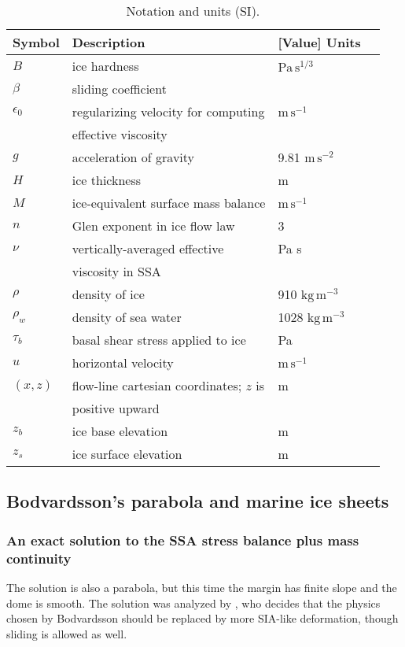 \documentclass[twocolumn,letterpaper]{igs}
\newcommand{\eps}{\epsilon}
\begin{document}
\small
\begin{table}
\caption{Notation and units (SI).}\label{tab:notation}

\medskip
\begin{tabular}{llll}
Symbol & Description & [Value] Units \\ \hline
$B$ & ice hardness & $\text{Pa}\,\text{s}^{1/3}$  \\
$\beta$ & sliding coefficient & \\
$\eps_0$ & regularizing velocity for computing & $\text{m}\,\text{s}^{-1}$ \\
 & \quad effective viscosity &  \\
$g$ & acceleration of gravity  & 9.81 $\text{m}\,\text{s}^{-2}$\\
$H$ & ice thickness & m \\
$M$ & ice-equivalent surface mass balance & $\text{m}\,\text{s}^{-1}$ \\
$n$ & Glen exponent in ice flow law & 3 \\
$\nu$ & vertically-averaged effective & Pa s \\
 & \quad  viscosity in SSA & \\
$\rho$ & density of ice & 910 $\text{kg}\,\text{m}^{-3}$ \\
$\rho_w$ & density of sea water & 1028 $\text{kg}\,\text{m}^{-3}$ \\
$\tau_{b}$ & basal shear stress applied to ice & Pa \\
$u$ & horizontal velocity & $\text{m}\,\text{s}^{-1}$ \\
$(x,z)$ & flow-line cartesian coordinates; $z$ is & m  \\
 & \quad positive upward & \\
$z_b$ & ice base elevation & m \\
$z_s$ & ice surface elevation & m
\end{tabular}
\end{table}


\subsection*{Bodvardsson's parabola and marine ice sheets}

\subsubsection*{An exact solution to the SSA stress balance plus mass continuity}
The \cite{Bodvardsson} solution is also a parabola, but this time the margin has finite slope and the dome is smooth.  The \cite{Bodvardsson} solution was analyzed by \cite{Weertman61stability}, who decides that the physics chosen by Bodvardsson should be replaced by more SIA-like deformation, though sliding is allowed as well.
\end{document}
